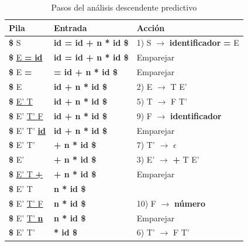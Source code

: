 \begin{table}[!t]
\caption{Pasos del análisis descendente predictivo}
    \label{tab:tabla-analisis-descendente-predictivo}
    \centering
\begin{tabular}{l|l|l}
      \hline 
      \textbf{Pila}  \hspace{10ex}                     & \textbf{Entrada}  \hspace{7ex}         & \textbf{Acción} \hspace{8ex}  \\
      \hline 
       {\bf \$} {S}                              & \textbf{ {id} = id + n * id \$}  & 1) S $\rightarrow$ {\bf identificador} {\bf =}  E     \\
       {\bf \$} \underline{E  {\bf =} {\bf id}}  & \textbf{ {id} = id + n * id \$}  & Emparejar   \\
       {\bf \$}  E  {\bf = }                     & \textbf{ {=} id + n * id \$}     & Emparejar   \\
       {\bf \$}  {E}                             & \textbf{ {id} + n * id \$}       & 2) E $\rightarrow$ T E'    \\
       {\bf \$}  \underline{E' {T}}              & \textbf{ {id} + n * id \$}       & 5) T $\rightarrow$ F T'     \\
       {\bf \$}  E' \underline{T' {F}}           & \textbf{ {id} + n * id \$}       & 9) F $\rightarrow$ {\bf identificador}   \\
       {\bf \$}  E' T' \underline{{\bf id}}      & \textbf{ {id} + n * id \$}       & Emparejar \\
       {\bf \$}  E' {T'}                         & \textbf{ {+} n * id \$}          & 7) T' $\rightarrow$ $\epsilon$ \\
       {\bf \$}  {E'}                            & \textbf{ {+} n * id \$}          & 3) E' $\rightarrow$ {\bf +} T E' \\
       {\bf \$} \underline{E' T  {\bf +}}        & \textbf{ {+} n * id \$}          & Emparejar \\
        {{{\bf \$} E' {T}}}  &  {{\textbf{ {n} * id \$}}}     &  \\
        {\bf \$} E' \underline{T' {F}}           &  \textbf{ {n} * id \$}          &  10) F $\rightarrow$ {\bf número} \\
        {\bf \$} E' \underline{T' {\bf n}}       &  \textbf{ {n} * id \$}          & Emparejar  \\
        {\bf \$} E' {T'}                         & \textbf{ {*}  id \$}            & 6) T' $\rightarrow$ {\bf *} F T' \\

\end{tabular}
\end{table}
